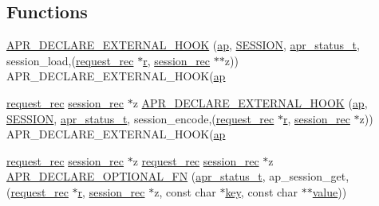 \subsection*{Functions}
\begin{DoxyCompactItemize}
\item 
\hyperlink{group__MOD__SESSION_ga647ac83b0c32ff0b6e5c7b6b9eeda688}{A\+P\+R\+\_\+\+D\+E\+C\+L\+A\+R\+E\+\_\+\+E\+X\+T\+E\+R\+N\+A\+L\+\_\+\+H\+O\+OK} (\hyperlink{group__apr__strings_ga21ecbc810cd93b85a818c96ca2f92f1a}{ap}, \hyperlink{group__MOD__SESSION_ga356e6480f30ba4f9ad049df5ef391cb0}{S\+E\+S\+S\+I\+ON}, \hyperlink{group__apr__errno_gaa5105fa83cc322f09382292db8b47593}{apr\+\_\+status\+\_\+t}, session\+\_\+load,(\hyperlink{structrequest__rec}{request\+\_\+rec} $\ast$\hyperlink{pcregrep_8txt_a2e9e9438b26c0bb4425367a7e4f75eb3}{r}, \hyperlink{structsession__rec}{session\+\_\+rec} $\ast$$\ast$z)) A\+P\+R\+\_\+\+D\+E\+C\+L\+A\+R\+E\+\_\+\+E\+X\+T\+E\+R\+N\+A\+L\+\_\+\+H\+O\+OK(\hyperlink{group__apr__strings_ga21ecbc810cd93b85a818c96ca2f92f1a}{ap}
\item 
\hyperlink{structrequest__rec}{request\+\_\+rec} \hyperlink{structsession__rec}{session\+\_\+rec} $\ast$z \hyperlink{group__MOD__SESSION_gaab4c781077aa085599d67c1cde6ea186}{A\+P\+R\+\_\+\+D\+E\+C\+L\+A\+R\+E\+\_\+\+E\+X\+T\+E\+R\+N\+A\+L\+\_\+\+H\+O\+OK} (\hyperlink{group__apr__strings_ga21ecbc810cd93b85a818c96ca2f92f1a}{ap}, \hyperlink{group__MOD__SESSION_ga356e6480f30ba4f9ad049df5ef391cb0}{S\+E\+S\+S\+I\+ON}, \hyperlink{group__apr__errno_gaa5105fa83cc322f09382292db8b47593}{apr\+\_\+status\+\_\+t}, session\+\_\+encode,(\hyperlink{structrequest__rec}{request\+\_\+rec} $\ast$\hyperlink{pcregrep_8txt_a2e9e9438b26c0bb4425367a7e4f75eb3}{r}, \hyperlink{structsession__rec}{session\+\_\+rec} $\ast$z)) A\+P\+R\+\_\+\+D\+E\+C\+L\+A\+R\+E\+\_\+\+E\+X\+T\+E\+R\+N\+A\+L\+\_\+\+H\+O\+OK(\hyperlink{group__apr__strings_ga21ecbc810cd93b85a818c96ca2f92f1a}{ap}
\item 
\hyperlink{structrequest__rec}{request\+\_\+rec} \hyperlink{structsession__rec}{session\+\_\+rec} $\ast$z \hyperlink{structrequest__rec}{request\+\_\+rec} \hyperlink{structsession__rec}{session\+\_\+rec} $\ast$z \hyperlink{group__MOD__SESSION_gaecb36abfb7f4899bdea4bddd545fe53b}{A\+P\+R\+\_\+\+D\+E\+C\+L\+A\+R\+E\+\_\+\+O\+P\+T\+I\+O\+N\+A\+L\+\_\+\+FN} (\hyperlink{group__apr__errno_gaa5105fa83cc322f09382292db8b47593}{apr\+\_\+status\+\_\+t}, ap\+\_\+session\+\_\+get,(\hyperlink{structrequest__rec}{request\+\_\+rec} $\ast$\hyperlink{pcregrep_8txt_a2e9e9438b26c0bb4425367a7e4f75eb3}{r}, \hyperlink{structsession__rec}{session\+\_\+rec} $\ast$z, const char $\ast$\hyperlink{apr__siphash_8h_adac0b6a30345ea1d0daa8a692b0b7ad9}{key}, const char $\ast$$\ast$\hyperlink{pcretest_8txt_a262ad32c75be9b93a7a77b045ed14fe0}{value}))

\end{DoxyCompactItemize}
